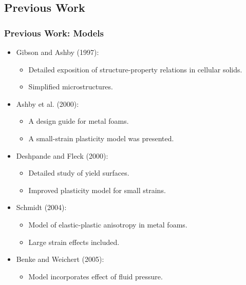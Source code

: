 \documentclass{beamer}
\begin{document}
    \subsection{Previous Work}
    \begin{frame}
      \frametitle{Previous Work: Models}
      \begin{itemize}[<+-| alert@+>]
        \item Gibson and Ashby (1997):
          \begin{itemize}
            \item Detailed exposition of structure-property relations
              in cellular solids.  
            \item Simplified microstructures.
          \end{itemize}
        \item Ashby et al. (2000):
          \begin{itemize}
            \item A design guide for metal foams.
            \item A small-strain plasticity model was presented.
          \end{itemize}
        \item Deshpande and Fleck (2000):
          \begin{itemize}
            \item Detailed study of yield surfaces.
            \item Improved plasticity model for small strains.
          \end{itemize}
        \item Schmidt (2004):
          \begin{itemize}
            \item Model of elastic-plastic anisotropy in metal foams.
            \item Large strain effects included.
          \end{itemize}
        \item Benke and Weichert (2005):
          \begin{itemize}
            \item Model incorporates effect of fluid pressure.
          \end{itemize}
      \end{itemize}
    \end{frame}
\end{document}
